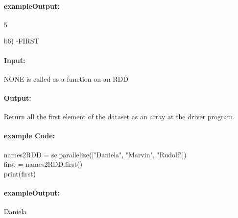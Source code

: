 \documentclass[11pt,a4paper]{scrartcl}
\begin{document}
\begin{itemize}
		\paragraph*{exampleOutput:}
		5
		
	\item[b6)]
		-FIRST
		\paragraph*{Input:}
		NONE is called as a function on an RDD
		
		\paragraph*{Output:}
		Return all the first element of the dataset as an array at the driver program.
		
		\paragraph*{example Code:}
		names2RDD = sc.parallelize(["Daniela", "Marvin", "Rudolf"])\\
   	 	first = names2RDD.first()\\
    		print(first)\\
		
		\paragraph*{exampleOutput:}
		Daniela
		
	\end{itemize}
\end{document}
